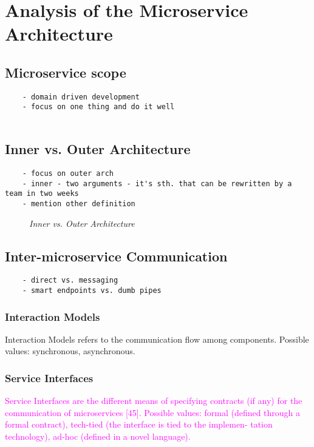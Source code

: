 \documentclass[thesis=M,english,hidelinks]{FITthesis}[2012/10/20]
\begin{document}
% 
% 

\chapter{Analysis of the Microservice Architecture}
\label{sec:msa_analysis}

\section{Microservice scope}
\begin{verbatim}
    - domain driven development
    - focus on one thing and do it well
    
\end{verbatim}

\section{Inner vs. Outer Architecture}
\begin{verbatim}
    - focus on outer arch
    - inner - two arguments - it's sth. that can be rewritten by a team in two weeks
    - mention other definition
\end{verbatim}
\begin{figure}
 \caption{\textit{Inner vs. Outer Architecture}}
 \label{fig:in-vs-out-arch}
\end{figure}


\section{Inter-microservice Communication}
\begin{verbatim}
    - direct vs. messaging
    - smart endpoints vs. dumb pipes
\end{verbatim}

\subsection{Interaction Models}
Interaction Models refers to the communication flow among components. Possible values: synchronous, asynchronous.

\subsection{Service Interfaces}
\textcolor{magenta}{Service Interfaces are the different means of specifying contracts (if any) for the communication of microservices [45]. Possible values: formal (defined through a formal contract), tech-tied (the interface is tied to the implemen- tation technology), ad-hoc (defined in a novel language).}
\end{document}
